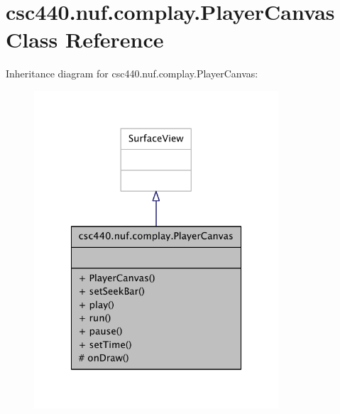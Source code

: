 \hypertarget{classcsc440_1_1nuf_1_1complay_1_1_player_canvas}{\section{csc440.\-nuf.\-complay.\-Player\-Canvas Class Reference}
\label{classcsc440_1_1nuf_1_1complay_1_1_player_canvas}
}


Inheritance diagram for csc440.\-nuf.\-complay.\-Player\-Canvas\-:
\nopagebreak
\begin{figure}[H]
\begin{center}
\leavevmode
\includegraphics[width=258pt]{classcsc440_1_1nuf_1_1complay_1_1_player_canvas__inherit__graph}
\end{center}
\end{figure}


